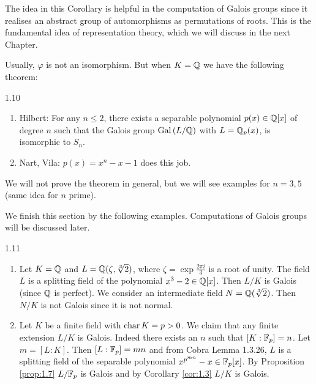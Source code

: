 \documentclass[twoside = false,	%
		headsepline,		%
		parskip = true,
		]{scrbook}						%
\begin{document}
        The idea in this Corollary is helpful in the computation of Galois groups since it realises an abstract group of automorphisms as permutations of roots. This is the fundamental idea of representation theory, which we will discuss in the next Chapter.
        
        Usually, $\varphi$ is not an isomorphism. But when $K = \mathbb Q$  we have the following theorem:
        
        \begin{theorem}{}{1.10}
        \begin{enumerate}
            \item Hilbert: For any $n \leq 2$, there exists a separable polynomial $p(x) \in \mathbb Q[x]$ of degree $n$ such that the Galois group $\mathrm{Gal}\left( L/\mathbb Q\right)$ with $L = \mathbb Q_p(x)$, is isomorphic to $S_n$.
            \item Nart, Vila: $p(x) = x^n - x -1$ does this job.
        \end{enumerate}
        \end{theorem}
        
        We will not prove the theorem in general, but we will see examples for $n=3,5$ (same idea for $n$ prime).
        
        We finish this section by the following examples. Computations of Galois groups will be discussed later.
        
        \begin{example}{}{1.11}
            \begin{enumerate}
                \item Let $K=\mathbb Q$ and $L = \mathbb Q(\zeta,\sqrt[3]{2})$, where $\zeta = \exp{\frac{2\pi i}{3}}$ is a root of unity. The field $L$ is a splitting field of the polynomial $x^3-2 \in \mathbb Q[x]$. Then $L/K$ is Galois (since $\mathbb Q$ is perfect). We consider an intermediate field $N = \mathbb Q(\sqrt[3]{2})$. Then $N/K$ is not Galois since it is not normal.
                \item Let $K$ be a finite field with $\mathrm{char} \, K = p > 0$. We claim that any finite extension $L/K$ is Galois. Indeed there exists an $n$ such that $[K:\mathbb F_p] = n$. Let $m = [L:K]$. Then $[L:\mathbb F_p] = mn$ and from Cobra \cite{Cobra} Lemma 1.3.26, $L$ is a splitting field of the separable polynomial $x^{p^{mn}}-x\in \mathbb F_p[x]$. By Proposition \ref{prop:1.7} $L/\mathbb F_p$ is Galois and by Corollary \ref{cor:1.3} $L/K$ is Galois. %
            \end{enumerate}
        \end{example}
        
\end{document}
